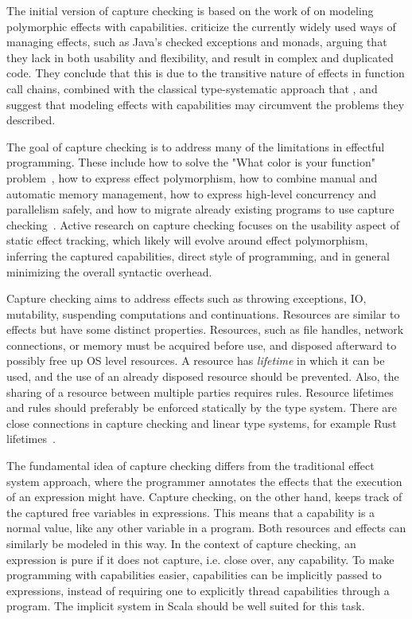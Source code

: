 The initial version of capture checking is based on the work of \textcite{scoped-capabilities} on modeling polymorphic effects with capabilities. \citeauthor{scoped-capabilities} criticize the currently widely used ways of managing effects, such as Java's checked exceptions and monads, arguing that they lack in both usability and flexibility, and result in complex and duplicated code. They conclude that this is due to the transitive nature of effects in function call chains, combined with the classical type-systematic approach that , and suggest that modeling effects with capabilities may circumvent the problems they described.

The goal of capture checking is to address many of the limitations in effectful programming. These include how to solve the "What color is your function" problem~\cite{what-color-is-your-function}, how to express effect polymorphism, how to combine manual and automatic memory management, how to express high-level concurrency and parallelism safely, and how to migrate already existing programs to use capture checking~\cite{odersky-twitter-caprese}. Active research on capture checking focuses on the usability aspect of static effect tracking, which likely will evolve around effect polymorphism, inferring the captured capabilities, direct style of programming, and in general minimizing the overall syntactic overhead.

Capture checking aims to address effects such as throwing exceptions, IO, mutability, suspending computations and continuations. Resources are similar to effects but have some distinct properties. Resources, such as file handles, network connections, or memory must be acquired before use, and disposed afterward to possibly free up OS level resources. A resource has \textit{lifetime} in which it can be used, and the use of an already disposed resource should be prevented. Also, the sharing of a resource between multiple parties requires rules. Resource lifetimes and rules should preferably be enforced statically by the type system. There are close connections in capture checking and linear type systems, for example Rust lifetimes~\cite{rust-lifetimes}.

The fundamental idea of capture checking differs from the traditional effect system approach, where the programmer annotates the effects that the execution of an expression might have. Capture checking, on the other hand, keeps track of the captured free variables in expressions. This means that a capability is a normal value, like any other variable in a program. Both resources and effects can similarly be modeled in this way. In the context of capture checking, an expression is pure if it does not capture, i.e. close over, any capability. To make programming with capabilities easier, capabilities can be implicitly passed to expressions, instead of requiring one to explicitly thread capabilities through a program. The implicit system in Scala should be well suited for this task.

